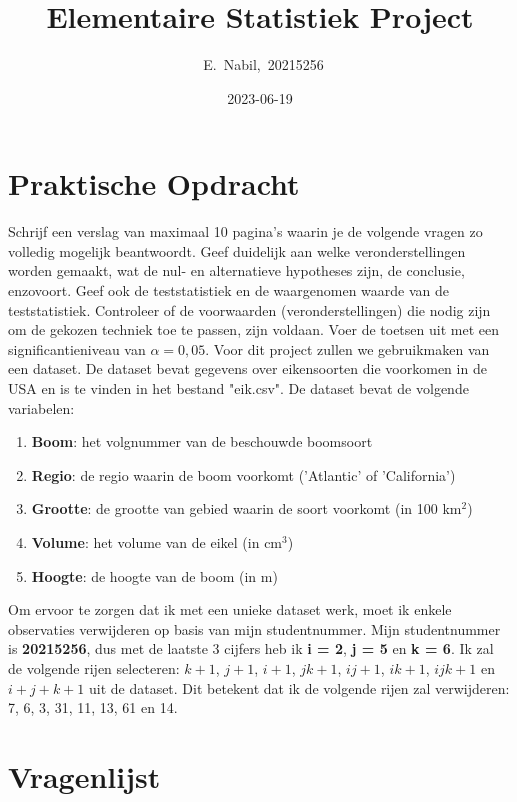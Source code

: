 \documentclass[12pt]{article}
\begin{document}
\title{Elementaire Statistiek Project}
\author{~E.~Nabil,~20215256\\}
\date{2023-06-19}
\maketitle
\section{Praktische Opdracht}
Schrijf een verslag van maximaal 10 pagina's waarin je de volgende vragen zo volledig mogelijk beantwoordt. 
Geef duidelijk aan welke veronderstellingen worden gemaakt, wat de nul- en alternatieve hypotheses zijn, de conclusie, enzovoort. 
Geef ook de teststatistiek en de waargenomen waarde van de teststatistiek. 
Controleer of de voorwaarden (veronderstellingen) die nodig zijn om de gekozen techniek toe te passen, zijn voldaan. 
Voer de toetsen uit met een significantieniveau van $\alpha = 0,05$.
Voor dit project zullen we gebruikmaken van een dataset. 
De dataset bevat gegevens over eikensoorten die voorkomen in de USA en is te vinden in het bestand "eik.csv". 
De dataset bevat de volgende variabelen:
\begin{enumerate}
    \item \textbf{Boom}: het volgnummer van de beschouwde boomsoort
    \item \textbf{Regio}: de regio waarin de boom voorkomt ('Atlantic' of 'California')
    \item \textbf{Grootte}: de grootte van gebied waarin de soort voorkomt (in 100 km$^2$)
    \item \textbf{Volume}: het volume van de eikel (in cm$^3$)
    \item \textbf{Hoogte}: de hoogte van de boom (in m)
\end{enumerate}
Om ervoor te zorgen dat ik met een unieke dataset werk, moet ik enkele observaties verwijderen op basis van mijn studentnummer. Mijn studentnummer is \textbf{20215256}, dus met de laatste 3 cijfers heb ik \textbf{i = 2}, \textbf{j = 5} en \textbf{k = 6}.
Ik zal de volgende rijen selecteren: $k + 1$, $j + 1$, $i + 1$, $jk + 1$, $ij + 1$, $ik + 1$, $ijk + 1$ en $i + j + k + 1$ uit de dataset.
Dit betekent dat ik de volgende rijen zal verwijderen: 7, 6, 3, 31, 11, 13, 61 en 14.

\newpage
\section{Vragenlijst}
\end{document}
